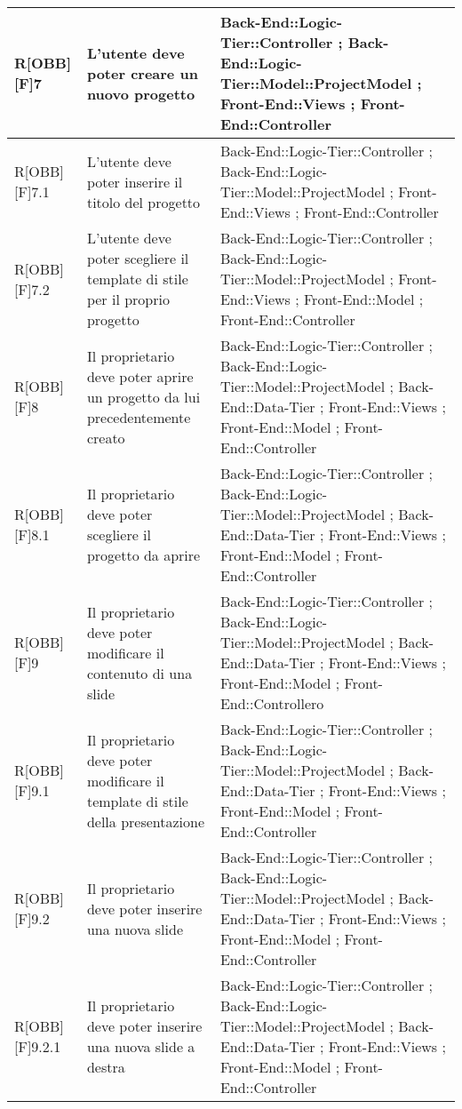 	\begin{table}[h]
		\begin{tabular}{|p{}|p{}|p{}|}
			\midrule

				R[OBB][F]7 & L'utente deve poter creare un nuovo progetto & Back-End::Logic-Tier::Controller ; Back-End::Logic-Tier::Model::ProjectModel ; Front-End::Views ; Front-End::Controller \\ \midrule
				R[OBB][F]7.1 & L'utente deve poter inserire il titolo del progetto & Back-End::Logic-Tier::Controller ; Back-End::Logic-Tier::Model::ProjectModel ; Front-End::Views ; Front-End::Controller \\ \midrule
				R[OBB][F]7.2 & L'utente deve poter scegliere il template di stile per il proprio progetto & Back-End::Logic-Tier::Controller ; Back-End::Logic-Tier::Model::ProjectModel ; Front-End::Views ; Front-End::Model ; Front-End::Controller \\ \midrule
				R[OBB][F]8 & Il proprietario deve poter aprire un progetto da lui precedentemente creato & Back-End::Logic-Tier::Controller ; Back-End::Logic-Tier::Model::ProjectModel ; Back-End::Data-Tier ; Front-End::Views ; Front-End::Model ; Front-End::Controller \\ \midrule
				R[OBB][F]8.1 & Il proprietario deve poter scegliere il progetto da aprire & Back-End::Logic-Tier::Controller ; Back-End::Logic-Tier::Model::ProjectModel ; Back-End::Data-Tier ; Front-End::Views ; Front-End::Model ; Front-End::Controller \\ \midrule
				R[OBB][F]9 & Il proprietario deve poter modificare il contenuto di una slide & Back-End::Logic-Tier::Controller ; Back-End::Logic-Tier::Model::ProjectModel ; Back-End::Data-Tier ; Front-End::Views ; Front-End::Model ; Front-End::Controllero \\ \midrule
				R[OBB][F]9.1 & Il proprietario deve poter modificare il template di stile della presentazione & Back-End::Logic-Tier::Controller ; Back-End::Logic-Tier::Model::ProjectModel ; Back-End::Data-Tier ; Front-End::Views ; Front-End::Model ; Front-End::Controller \\ \midrule
				R[OBB][F]9.2 & Il proprietario deve poter inserire una nuova slide & Back-End::Logic-Tier::Controller ; Back-End::Logic-Tier::Model::ProjectModel ; Back-End::Data-Tier ; Front-End::Views ; Front-End::Model ; Front-End::Controller \\ \midrule
				R[OBB][F]9.2.1 & Il proprietario deve poter inserire una nuova slide a destra & Back-End::Logic-Tier::Controller ; Back-End::Logic-Tier::Model::ProjectModel ; Back-End::Data-Tier ; Front-End::Views ; Front-End::Model ; Front-End::Controller \\ \midrule

\end{tabular}
\end{table}
